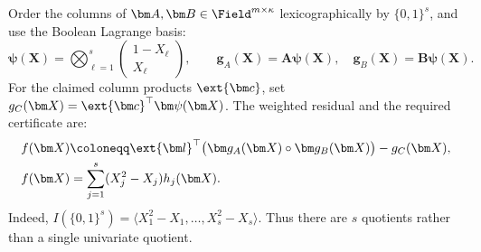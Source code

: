 Order the columns of \(\bm A,\bm B\in\Field^{m\times\kappa}\)
lexicographically by \(\{0,1\}^s\), and use the Boolean
Lagrange basis:
\[
    \bm\psi(\bm X)=
       \bigotimes_{\ell=1}^s
       \begin{pmatrix}1-X_\ell\\X_\ell\end{pmatrix},
    \qquad
    \bm g_A(\bm X)=\bm A\bm\psi(\bm X),
    \quad
    \bm g_B(\bm X)=\bm B\bm\psi(\bm X).
\]
For the claimed column products \(\ext{\bm c}\), set
\(g_C(\bm X)=\ext{\bm c}^{\top}\bm\psi(\bm X)\).
The weighted residual and the required certificate are:
\begin{equation}
\begin{aligned}
    f(\bm X)
      &\coloneqq\ext{\bm l}^{\top}
          \bigl(\bm g_A(\bm X)\circ\bm g_B(\bm X)\bigr)
          -g_C(\bm X),\\
    f(\bm X)&=\sum_{j=1}^s(X_j^2-X_j)h_j(\bm X).
\end{aligned}
\label{eq:binary-hadamard-certificate}
\end{equation}
Indeed, \(I(\{0,1\}^s)=
\langle X_1^2-X_1,\ldots,X_s^2-X_s\rangle\).
Thus there are \(s\) quotients rather than a single univariate
quotient.

